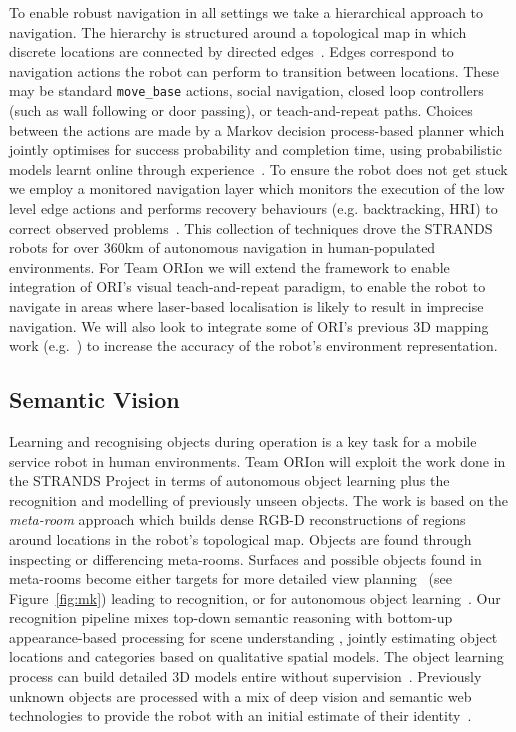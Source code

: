 \documentclass[runningheads,a4paper]{llncs}
\newcommand{\teamori}{Team ORIon}
\begin{document}
To enable robust navigation in all settings we take a hierarchical approach to navigation. The hierarchy is structured around a topological map in which discrete locations are connected by directed edges~\cite{jpulido2015NowOrLater}. Edges correspond to navigation actions the robot can perform to transition between locations. These may be standard \texttt{move\_base} actions, social navigation, closed loop controllers (such as wall following or door passing), or teach-and-repeat paths. Choices between the actions are made by a Markov decision process-based planner which jointly optimises for success probability and completion time, using probabilistic models learnt online through experience~\cite{LPH14b}. To ensure the robot does not get stuck we employ a monitored navigation layer which monitors the execution of the low level edge actions and performs recovery behaviours (e.g. backtracking, HRI) to correct observed problems~\cite{strands@ram}. This collection of techniques drove the STRANDS robots for over 360km of autonomous navigation in human-populated environments. For \teamori{} we will extend the framework to enable integration of ORI's visual teach-and-repeat paradigm, to enable the robot to navigate in areas where laser-based localisation is likely to result in imprecise navigation. We will also look to integrate some of ORI's previous 3D mapping work (e.g.~\cite{AmayoICRA2016}) to increase the accuracy of the robot's environment representation.

\subsection{Semantic Vision}

Learning and recognising objects during operation is a key task for a mobile service robot in human environments. \teamori{} will exploit the work done in the STRANDS Project in terms of autonomous object learning plus the recognition and modelling of previously unseen objects. The work is based on the \emph{meta-room} approach which builds dense RGB-D reconstructions of regions around locations in the robot's topological map. Objects are found through inspecting or differencing meta-rooms. Surfaces and possible objects found in meta-rooms become either targets for more detailed view planning~\cite{kunze14indirect} (see Figure~\ref{fig:mk}) leading to recognition, or for autonomous object learning~\cite{Faeulhammer:2016}. Our recognition pipeline mixes top-down semantic reasoning with bottom-up appearance-based processing for scene understanding \cite{kunze14topdown}, jointly estimating object locations and categories based on qualitative spatial models\cite{kunze14bootstrapping}. The object learning process can build detailed 3D models entire without supervision~\cite{Faeulhammer:2016}. Previously unknown  objects are processed with a mix of deep vision and semantic web technologies to provide the robot with an initial estimate of their identity~\cite{aloof@icra17}.
\end{document}
